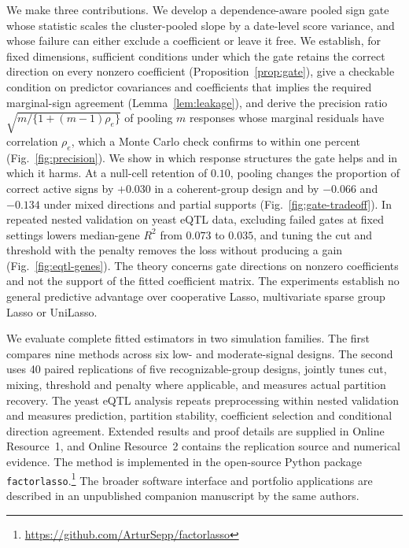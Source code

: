\documentclass[lineno,pdflatex,sn-basic]{sn-jnl}
\theoremstyle{thmstyleone}
\begin{document}
We make three contributions. We develop a dependence-aware pooled sign gate
whose statistic scales the cluster-pooled slope by a date-level score
variance, and whose failure can either exclude a coefficient or leave it
free. We establish, for fixed dimensions, sufficient conditions under which the
gate retains the correct direction on every nonzero coefficient
(Proposition~\ref{prop:gate}), give a checkable condition on predictor
covariances and coefficients that implies the required marginal-sign
agreement (Lemma~\ref{lem:leakage}), and derive the precision ratio
$\sqrt{m/\{1+(m-1)\rho_e\}}$ of pooling $m$ responses whose marginal
residuals have correlation $\rho_e$, which a Monte Carlo check confirms to
within one percent (Fig.~\ref{fig:precision}). We show in which response
structures the gate helps and in which it harms. At a null-cell retention of
$0.10$, pooling changes the proportion of correct active signs by $+0.030$ in
a coherent-group design and by $-0.066$ and $-0.134$ under mixed directions
and partial supports (Fig.~\ref{fig:gate-tradeoff}). In repeated nested
validation on yeast eQTL data, excluding failed gates at fixed settings lowers
median-gene $R^2$ from $0.073$ to $0.035$, and tuning the cut and threshold
with the penalty removes the loss without producing a gain
(Fig.~\ref{fig:eqtl-genes}). The theory concerns gate directions on nonzero
coefficients and not the support of the fitted coefficient matrix. The
experiments establish no general predictive advantage over cooperative Lasso,
multivariate sparse group Lasso or UniLasso.

We evaluate complete fitted estimators in two simulation families. The first
compares nine methods across six low- and moderate-signal designs. The second
uses 40 paired replications of five recognizable-group designs, jointly tunes
cut, mixing, threshold and penalty where applicable, and measures actual
partition recovery. The yeast eQTL analysis repeats preprocessing within
nested validation and measures prediction, partition stability, coefficient
selection and conditional direction agreement. Extended results and proof
details are supplied in Online Resource~1, and Online Resource~2 contains the
replication source and numerical evidence. The method is implemented in the
open-source Python package
\texttt{factorlasso}.\footnote{\url{https://github.com/ArturSepp/factorlasso}}
The broader software interface and portfolio applications are described in an
unpublished companion manuscript by the same authors.
\end{document}
